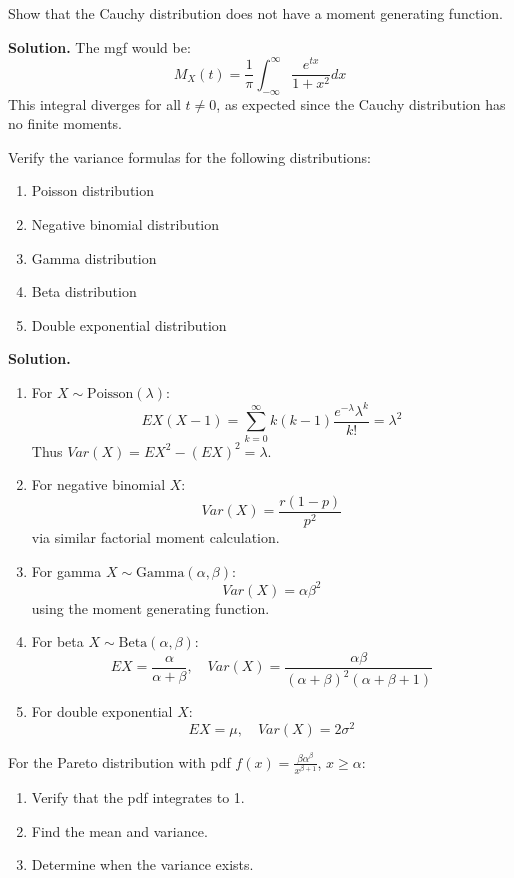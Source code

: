 \begin{problembox}
Show that the Cauchy distribution does not have a moment generating function.
\end{problembox}

\noindent\textbf{Solution.}
The mgf would be:
\[
M_X(t) = \frac{1}{\pi}\int_{-\infty}^\infty \frac{e^{tx}}{1+x^2}dx
\]
This integral diverges for all $t \neq 0$, as expected since the Cauchy distribution has no finite moments.

\begin{problembox}
Verify the variance formulas for the following distributions:
\begin{enumerate}[label=(\alph*)]
\item Poisson distribution
\item Negative binomial distribution
\item Gamma distribution
\item Beta distribution
\item Double exponential distribution
\end{enumerate}
\end{problembox}

\noindent\textbf{Solution.}
\begin{enumerate}[label=(\alph*)]
\item For $X \sim \text{Poisson}(\lambda)$:
\[
EX(X-1) = \sum_{k=0}^\infty k(k-1)\frac{e^{-\lambda}\lambda^k}{k!} = \lambda^2
\]
Thus $Var(X) = EX^2 - (EX)^2 = \lambda$.

\item For negative binomial $X$:
\[
Var(X) = \frac{r(1-p)}{p^2}
\]
via similar factorial moment calculation.

\item For gamma $X \sim \text{Gamma}(\alpha,\beta)$:
\[
Var(X) = \alpha\beta^2
\]
using the moment generating function.

\item For beta $X \sim \text{Beta}(\alpha,\beta)$:
\[
EX = \frac{\alpha}{\alpha+\beta}, \quad Var(X) = \frac{\alpha\beta}{(\alpha+\beta)^2(\alpha+\beta+1)}
\]

\item For double exponential $X$:
\[
EX = \mu, \quad Var(X) = 2\sigma^2
\]
\end{enumerate}

\begin{problembox}
For the Pareto distribution with pdf $f(x) = \frac{\beta\alpha^\beta}{x^{\beta+1}}$, $x \geq \alpha$:
\begin{enumerate}[label=(\alph*)]
\item Verify that the pdf integrates to 1.
\item Find the mean and variance.
\item Determine when the variance exists.
\end{enumerate}
\end{problembox}

